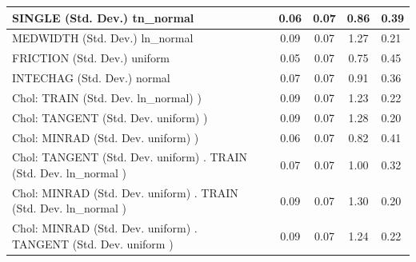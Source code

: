 \begin{table}
\begin{center}
\begin{tabular}{|l|l|c|c|c|l|}
			\hline
			SINGLE (Std. Dev.) tn_normal &  & 0.06 & 0.07 & 0.86 & 0.39 \\
			\hline
			MEDWIDTH (Std. Dev.) ln_normal &  & 0.09 & 0.07 & 1.27 & 0.21 \\
			\hline
			FRICTION (Std. Dev.) uniform &  & 0.05 & 0.07 & 0.75 & 0.45 \\
			\hline
			INTECHAG (Std. Dev.) normal &  & 0.07 & 0.07 & 0.91 & 0.36 \\
			\hline
			 Chol: TRAIN (Std. Dev. ln_normal) ) &  & 0.09 & 0.07 & 1.23 & 0.22 \\
			\hline
			 Chol: TANGENT (Std. Dev. uniform) ) &  & 0.09 & 0.07 & 1.28 & 0.20 \\
			\hline
			 Chol: MINRAD (Std. Dev. uniform) ) &  & 0.06 & 0.07 & 0.82 & 0.41 \\
			\hline
			 Chol: TANGENT (Std. Dev. uniform) . TRAIN (Std. Dev.   ln_normal ) &  & 0.07 & 0.07 & 1.00 & 0.32 \\
			\hline
			 Chol: MINRAD (Std. Dev. uniform) . TRAIN (Std. Dev.   ln_normal ) &  & 0.09 & 0.07 & 1.30 & 0.20 \\
			\hline
			 Chol: MINRAD (Std. Dev. uniform) . TANGENT (Std. Dev.   uniform ) &  & 0.09 & 0.07 & 1.24 & 0.22 \\
			\hline
		\end{tabular}
	\end{center}
\end{table}